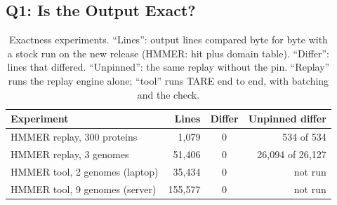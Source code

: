 \documentclass[letterpaper,twocolumn,10pt]{article}
\theoremstyle{definition}
\newcommand{\sys}{TARE\xspace}
\newcommand{\sys}{PARE\xspace}
\begin{document}
\subsection{Q1: Is the Output Exact?}
\label{sec:eval-exact}

\begin{table}[t]
\caption{Exactness experiments. ``Lines'': output lines compared byte for byte with a stock run on the new release
(HMMER: hit plus domain table). ``Differ'': lines that differed. ``Unpinned'': the same replay without the pin.
``Replay'' runs the replay engine alone; ``tool'' runs \sys end to end, with batching and the check.}
\label{tab:exact}
\centering\footnotesize
\setlength{\tabcolsep}{3pt}
\begin{tabular}{@{}lrcr@{}}
\toprule
Experiment & Lines & Differ & Unpinned differ \\
\midrule
HMMER replay, 300 proteins & 1{,}079 & 0 & 534 of 534 \\
HMMER replay, 3 genomes & 51{,}406 & 0 & 26{,}094 of 26{,}127 \\
HMMER tool, 2 genomes (laptop) & 35{,}434 & 0 & not run \\
HMMER tool, 9 genomes (server) & 155{,}577 & 0 & not run \\

\end{tabular}
\end{table}
\end{document}
